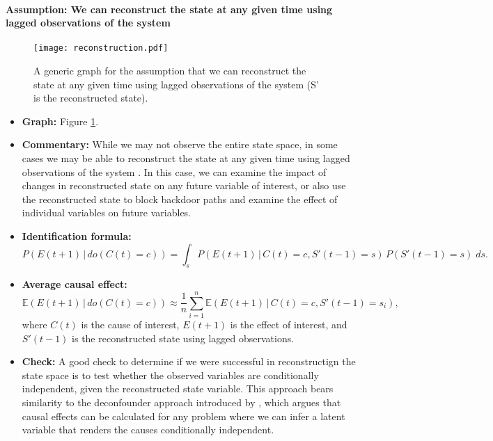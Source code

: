 \documentclass[12pt]{article}
\begin{document}
\newpage

\paragraph{Assumption: We can reconstruct the state at any given time
  using lagged observations of the system}

\begin{figure} \texttt{[image: reconstruction.pdf]}
  \caption{A generic graph for the assumption that we can reconstruct
    the state at any given time using lagged observations of the
    system (S' is the reconstructed state).}
  \label{fig:reconstruction}
\end{figure}

\begin{itemize}
\item \textbf{Graph:} Figure \ref{fig:reconstruction}.
\item \textbf{Commentary:} While we may not observe the entire state
  space, in some cases we may be able to reconstruct the state at any
  given time using lagged observations of the system \citep[see
  Takens' theorem,][]{takens1981detecting}. In this case, we can
  examine the impact of changes in reconstructed state on any future
  variable of interest, or also use the reconstructed state to block
  backdoor paths and examine the effect of individual variables on
  future variables.
\item \textbf{Identification formula:}
  \begin{equation*}
    P(E(t+1) \, | \, do(C(t) = c)) = \int_{s} P(E(t+1) \, | \, C(t) = c,
    S'(t-1) = s) \, P(S'(t-1)=s) \; d s.
  \end{equation*}
\item \textbf{Average causal effect:}
  \begin{equation*}
    \mathbb{E}(E(t+1) \, | \, do(C(t) = c)) \approx \frac{1}{n}
    \sum_{i=1}^n \mathbb{E}(E(t+1) \, | \, C(t)=c, S'(t-1)=s_i),
  \end{equation*}
  where $C(t)$ is the cause of interest, $E(t+1)$ is the effect of
  interest, and $S'(t-1)$ is the reconstructed state using lagged
  observations.
\item \textbf{Check:} A good check to determine if we were successful
  in reconstructign the state space is to test whether the observed
  variables are conditionally independent, given the reconstructed
  state variable. This approach bears similarity to the deconfounder
  approach introduced by \cite{yixin-2019}, which argues that causal
  effects can be calculated for any problem where we can infer a
  latent variable that renders the causes conditionally
  independent.
\end{itemize}
\end{document}
